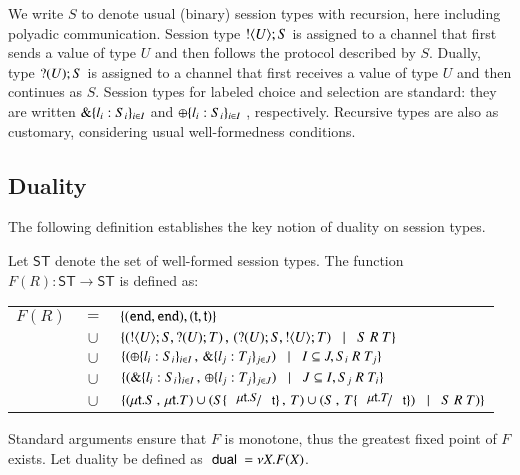 We write $S$ to denote usual (binary) session types with recursion, here including 
polyadic communication. 
Session type $! \langle U \rangle ; S$ is assigned to a channel that first sends a value of type $U$ and then follows
the protocol described by $S$.
Dually, type $? (U) ; S$ is assigned to a channel  
that first receives a value of type $U$ and then continues as $S$. 
Session types for labeled choice and selection are standard: they are 
written $\& \{l_i:S_i\}_{i \in I}$ and $\oplus \{l_i:S_i\}_{i \in I}$ , respectively. 
Recursive types are also as customary, considering usual 
well-formedness conditions.



\subsection{Duality}
The following definition establishes the key notion of duality on session types.
%
\begin{definition}[Duality]\rm
Let $\mathsf{ST}$ denote the set of well-formed session types.
The function $F(R): \mathsf{ST} \longrightarrow \mathsf{ST}$ is defined as:

	\begin{tabular}{rcl}
		$F(R)$ &$=$&		$\{(\mathtt{end}, \mathtt{end}), (\mathsf{t}, \mathsf{t})\}$\\
			&$\cup$&	$\set{(\btout{U} S, \btinp{U} T)\,,\, (\btinp{U} S, \btout{U} T) \bnfbar S\ R\ T}$\\
			&$\cup$&	$\{(\oplus \{l_i: S_i\}_{i \in I} \,,\, \& \{l_j: T_j\}_{j \in J}) \;\;\;|\;\;\; I \subseteq J, S_i\ R\ T_j\}$\\
			&$\cup$&	$\{(\& \{l_i: S_i\}_{i \in I}\,,\, \oplus \{l_j: T_j\}_{j \in J}) \;\;\;|\;\;\; J \subseteq I, S_j\ R\ T_i\}$\\
			&$\cup$&	$\set{(\trec{t}{S}\,,\, \trec{t}{T}) \cup (S \subst{\trec{t}{S}}{\vart{t}}\,,\, T) \cup (S\,,\, T\subst{\trec{t}{T}}{\vart{t}}) \bnfbar S\ R\ T)}$
	\end{tabular}
	
\noindent
	Standard arguments ensure that $F$ is monotone, thus the greatest fixed point
	of $F$ exists. Let duality be defined as $\ \mathsf{dual}\  = \nu X. F(X)$.
\end{definition}
%

